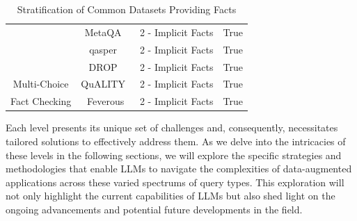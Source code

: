 \begin{table}[]
\begin{tabular}{cccc}
                      & \rule{0pt}{1em}MetaQA~\cite{metaqa_dataset}             & 2 - Implicit Facts & True               \\
                      & \rule{0pt}{1em}qasper~\cite{Dasigi2021ADO}              & 2 - Implicit Facts & True               \\
                      & \rule{0pt}{1em}DROP~\cite{dua2019drop}                  & 2 - Implicit Facts & True               \\
Multi-Choice          & \rule{0pt}{1em}QuALITY~\cite{pang2021quality}           & 2 - Implicit Facts & True               \\
Fact Checking         & \rule{0pt}{1em} Feverous\cite{aly2021feverous} \vspace{0.2em}          & 2 - Implicit Facts & True               \\ \hline
\end{tabular}
\caption{Stratification of Common Datasets Providing Facts}
\label{tab: dataset_categorization}
\end{table}

Each level presents its unique set of challenges and, consequently, necessitates tailored solutions to effectively address them. As we delve into the intricacies of these levels in the following sections, we will explore the specific strategies and methodologies that enable LLMs to navigate the complexities of data-augmented applications across these varied spectrums of query types. This exploration will not only highlight the current capabilities of LLMs but also shed light on the ongoing advancements and potential future developments in the field.

